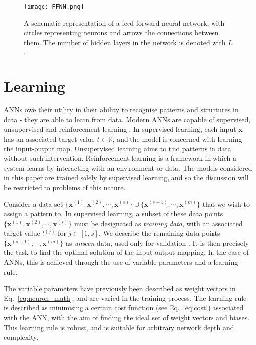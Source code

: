 \documentclass[twocolumn,superscriptaddress]{revtex4-1}
\begin{document}
\begin{figure}[t!]
\texttt{[image: FFNN.png]}
\caption{A schematic representation of a feed-forward neural network, with circles representing neurons and arrows the connections between them. The number of hidden layers in the network is denoted with $L$ \cite{Beer:2022wgv}.}
\label{fig:FFNN}
\end{figure}

\section{Learning} \label{learning}
ANNs owe their utility in their ability to recognise patterns and structures in data - they are able to learn from data. Modern ANNs are capable of supervised, unsupervised and reinforcement learning \cite{nielsenneural}. In supervised learning, each input $\bm{x}$ has an associated target value $t \in \mathbb{R}$, and the model is concerned with learning the input-output map. Unsupervised learning aims to find patterns in data without such intervention. Reinforcement learning is a framework in which a system learns by interacting with an environment or data. The models considered in this paper are trained solely by supervised learning, and so the discussion will be restricted to problems of this nature. 

Consider a data set $\{\bm{x}^{(1)}, \bm{x}^{(2)}, \cdots, \bm{x}^{(s)}\} \cup \{ \bm{x}^{({s+1})}, \cdots , \bm{x}^{(m)} \}$ that we wish to assign a pattern to. In supervised learning, a subset of these data points $\{\bm{x}^{(1)}, \bm{x}^{(2)}, \cdots, \bm{x}^{(s)}\}$ must be designated as \textit{training data}, with an associated target value ${t^{(j)}}$ for $j \in [1, s]$. We describe the remaining data points $\{\bm{x}^{({s+1})}, \cdots, \bm{x}^{(m)}\}$ as \textit{unseen} data, used only for validation \cite{Beer:2022wgv}. It is then precisely the task to find the optimal solution of the input-output mapping. In the case of ANNs, this is achieved through the use of variable parameters and a learning rule.

The variable parameters have previously been described as weight vectors in Eq.~\ref{eq:neuron_math}, and are varied in the training process. The learning rule is described as minimising a certain cost function (see Eq.~\ref{eq:cost})  associated with the ANN, with the aim of finding the ideal set of weight vectors and biases. This learning rule is robust, and is suitable for arbitrary network depth and complexity.
\end{document}

